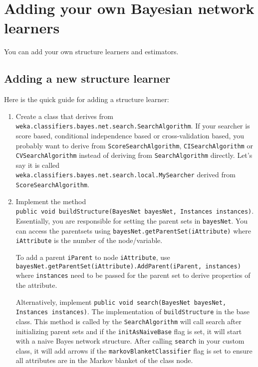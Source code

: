 \documentclass[a4paper]{article}
\begin{document}
\section{Adding your own Bayesian network learners}

You can add your own structure learners and estimators.

\subsection*{Adding a new structure learner}

Here is the quick guide for adding a structure learner:

\begin{enumerate}
\item Create a class that derives from {\tt weka.classifiers.bayes.net.search.SearchAlgorithm}.
  If your searcher is score based, conditional independence based or cross-validation based, you
  probably want to derive from {\tt ScoreSearchAlgorithm}, {\tt CISearchAlgorithm} or {\tt CVSearchAlgorithm}
  instead of deriving from {\tt SearchAlgorithm} directly.
  Let's say it is called \\{\tt weka.classifiers.bayes.net.search.local.MySearcher}
  derived from {\tt ScoreSearchAlgorithm}.

\item Implement the method\\
{\tt public void buildStructure(BayesNet bayesNet, Instances instances)}.
Essentially, you are responsible for setting the parent sets in {\tt bayesNet}.
You can access the parentsets using {\tt bayesNet.getParentSet(iAttribute)} where
{\tt iAttribute} is the number of the node/variable.

To add a parent {\tt iParent} to node {\tt iAttribute}, use\\ 
{\tt bayesNet.getParentSet(iAttribute).AddParent(iParent, instances)} where
{\tt instances} need to be passed for the parent set to derive properties of
the attribute.

Alternatively, implement
{\tt public void search(BayesNet bayesNet, Instances instances)}.
The implementation of {\tt buildStructure} in the base class.
This method is called by the {\tt SearchAlgorithm} will call search
after initializing parent sets and if the {\tt initAsNaiveBase} flag is set, it will
start with a naive Bayes network structure. After calling {\tt search} in your
custom class, it will add arrows if the {\tt markovBlanketClassifier} flag is 
set to ensure all attributes are in the Markov blanket of the class node.


\end{enumerate}
\end{document}
